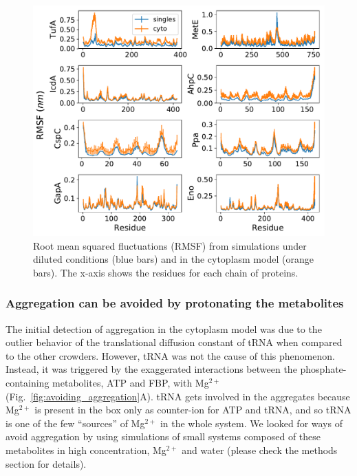 \documentclass[journal=jcisd8,manuscript=article]{achemso}
\begin{document}
\begin{figure}[H]
\includegraphics[scale=0.5]{rmsf.pdf}
\caption{Root mean squared fluctuations (RMSF) from simulations under
  diluted conditions (blue bars) and in the cytoplasm model (orange
  bars). The x-axis shows the residues for each chain of proteins.}
\label{fig:rmsf}
\end{figure}






\subsubsection{Aggregation can be avoided by protonating the metabolites}

The initial detection of aggregation in the cytoplasm model was due to
the outlier behavior of the translational diffusion constant of tRNA
when compared to the other crowders. However, tRNA was not the cause of this
phenomenon. Instead, it was triggered by the exaggerated interactions
between the phosphate-containing metabolites, ATP and FBP, with
Mg$^{2+}$ (Fig.~\ref{fig:avoiding_aggregation}A). tRNA gets involved
in the aggregates because Mg$^{2+}$ is present in the box only as
counter-ion for ATP and tRNA, and so tRNA is one of the few
``sources'' of Mg$^{2+}$ in the whole system. We looked for ways of
avoid aggregation by using simulations of small systems composed of
these metabolites in high concentration, Mg$^{2+}$ and water (please
check the methods section for details).
\end{document}
